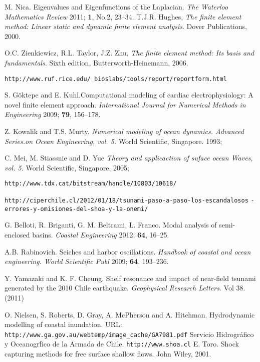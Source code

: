\documentclass[12pt, letterpaper]{article}
\begin{document}
\begin{thebibliography}{10}

  M. Nica. Eigenvalues and Eigenfunctions of the Laplacian. \emph{The Waterloo Mathematics Review} 2011; {\bf 1}, No.2, 23--34.
  T.J.R. Hughes, \emph{The finite element method: Linear static and dynamic finite element analysis}. Dover Publications, 2000.
  
  O.C. Zienkiewicz, R.L. Taylor, J.Z. Zhu, \emph{The finite element method: Its basis and fundamentals}. Sixth edition, Butterworth-Heinemann, 2006.  

 {\tt http://www.ruf.rice.edu/~bioslabs/tools/report/reportform.html }

	S. G\"{o}ktepe and E. Kuhl.Computational modeling of cardiac electrophysiology: A novel finite element approach. \emph{International Journal for Numerical Methods in Engineering} 2009; {\bf 79}, 156--178.
	
	Z. Kowalik and T.S. Murty. \emph{Numerical modeling of ocean dynamics. Advanced Series.on Ocean Engineering, vol. 5. }World Scientific, Singapore. 1993; 
	
	C. Mei, M. Stiassnie and D. Yue \emph{Theory and applicaction of suface ocean Waves, vol. 5. }World Scientific, Singapore. 2005; 

 {\tt http://www.tdx.cat/bitstream/handle/10803/10618/}

 {\tt http://ciperchile.cl/2012/01/18/tsunami-paso-a-paso-los-escandalosos} {\tt-errores-y-omisiones-del-shoa-y-la-onemi/
}

	G. Belloti, R. Briganti, G. M. Beltrami, L. Franco. Modal analysis of semi-enclosed basins. \emph{Coastal Engineering} 2012; {\bf 64}, 16--25.

	A.B. Rabinovich. Seiches and harbor oscillations. \emph{Handbook of coastal and ocean engineering. World Scientific Publ} 2009; {\bf 64}, 193--236.

	Y. Yamazaki and K. F. Cheung. Shelf resonance and impact of near-field tsunami generated by the 2010 Chile earthquake. {\it Geophysical Research Letters}. Vol 38. (2011)

	O. Nielsen, S. Roberts, D. Gray, A. McPherson and A. Hitchman. Hydrodynamic modelling of coastal inundation. URL: \verb; http://www.ga.gov.au/webtemp/image_cache/GA7981.pdf;
      Servicio Hidrogr\'afico y Oceanogr\'fico de la Armada de Chile. \verb;http://www.shoa.cl;
      E. Toro. Shock capturing methods for free surface shallow flows. John Wiley, 2001.
\end{thebibliography}
\end{document}
